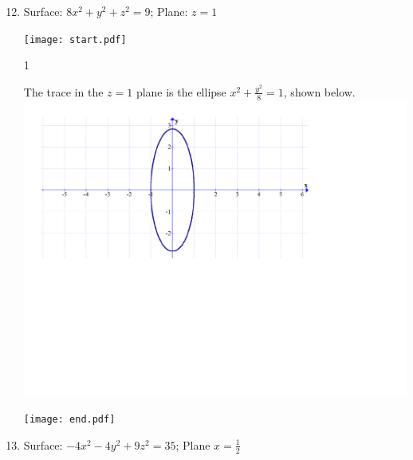 \documentclass[12pt]{article}
\begin{document}
\begin{enumerate}
\begin{enumerate}
\end{enumerate}

\end{enumerate}


\begin{enumerate}
\setcounter{enumi}{11}

\item Surface: $8x^2+y^2+z^2=9$; Plane: $z=1$

\texttt{[image: start.pdf]}
{{{1\linewidth}{\begin{center}The trace in the $z=1$ plane is the ellipse $x^2+\frac{y^2}{8}=1$, shown below.\\
\includegraphics[scale=0.5]{trace1.pdf}
\end{center}}}}
\texttt{[image: end.pdf]}


\item Surface: $-4x^2-4y^2+9z^2=35$; Plane $x=\frac{1}{2}$


\end{enumerate}
\end{document}
